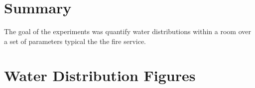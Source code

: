 \documentclass{article}
\begin{document}
\section{Summary}

The goal of the experiments was quantify water distributions within a room over a set of parameters typical the the fire service. 





\clearpage

\appendix



\section{Water Distribution Figures}
\label{app:Water_Distribution_Figures}
\end{document}

